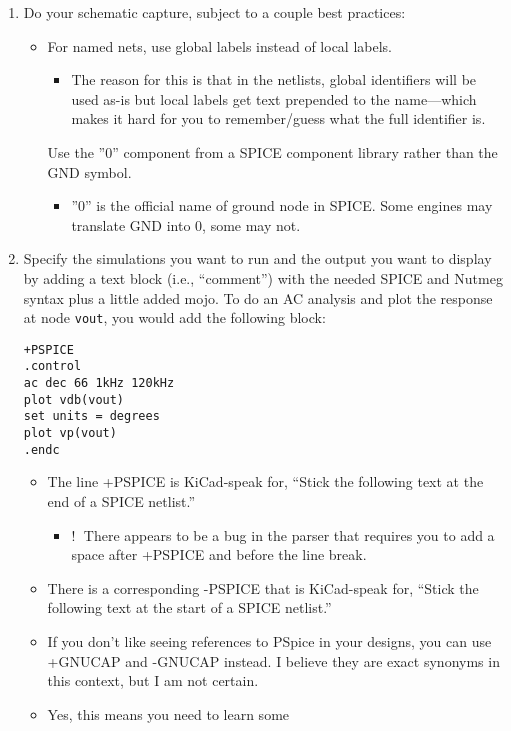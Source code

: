 \begin{enumerate}
  \item 
Do your schematic capture, subject to a couple best practices:
\begin{itemize}
  \item 
For named nets, use global labels instead of local labels.
\begin{itemize}
  \item 
The reason for this is that in the netlists, global identifiers will be used
as-is but local labels get text prepended to the name—which makes it hard for
you to remember/guess what the full identifier is.
\end{itemize}
Use the ”0” component from a SPICE component library rather than the GND symbol.
\begin{itemize}
  \item 
”0” is the official name of ground node in SPICE. Some engines may translate GND
into 0, some may not.
\end{itemize}
\end{itemize}
  \item 
Specify the simulations you want to run and the output you want to display by
adding a text block (i.e., “comment”) with the needed SPICE and Nutmeg syntax
plus a little added mojo. To do an AC analysis and plot the response at node
\verb|vout|, you would add the following block:
\begin{lstlisting}[style=SPICE]
+PSPICE 
.control
ac dec 66 1kHz 120kHz 
plot vdb(vout)
set units = degrees
plot vp(vout)
.endc
\end{lstlisting}
\begin{itemize}
  \item 
The line +PSPICE is KiCad-speak for, “Stick the following text at the end of a
SPICE netlist.”
\begin{itemize}
  \item 
\textcircled{!} There appears to be a bug in the parser that requires you to add
a space after +PSPICE and before the line break.
\end{itemize}
  \item 
There is a corresponding -PSPICE that is KiCad-speak for, “Stick the following
text at the start of a SPICE netlist.”
  \item 
If you don't like seeing references to PSpice in your designs, you can use
+GNUCAP and -GNUCAP instead. I believe they are exact synonyms in this context,
but I am not certain.
  \item 
Yes, this means you need to learn some

\end{itemize}
\end{enumerate}
